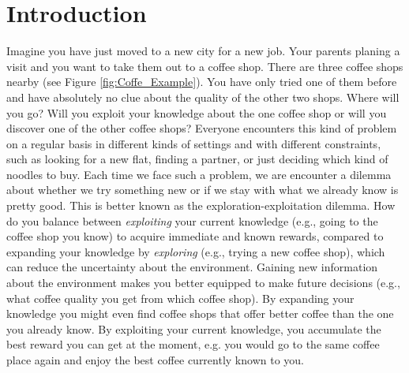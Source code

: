 %
\chapter{Introduction}
Imagine you have just moved to a new city for a new job. Your parents planing a visit and you want to take them out to a coffee shop. There are three coffee shops nearby (see Figure \ref{fig:Coffe_Example}). You have only tried one of them before and have absolutely no clue about the quality of the other two shops. Where will you go? Will you exploit your knowledge about the one coffee shop or will you discover one of the other coffee shops?
Everyone encounters this kind of problem on a regular basis in different kinds of settings and with different constraints, such as looking for a new flat, finding a partner, or just deciding which kind of noodles to buy. 
Each time we face such a problem, we are encounter a dilemma about whether we try something new or if we stay with what we already know is pretty good. 
This is better known as the exploration-exploitation dilemma. How do you balance between \textit{exploiting} your current knowledge (e.g., going to the coffee shop you know) to acquire immediate and known rewards, compared to expanding your knowledge by \textit{exploring} (e.g., trying a new coffee shop), which can reduce the uncertainty about the environment.
Gaining new information about the environment makes you better equipped to make future decisions (e.g., what coffee quality you get from which coffee shop). By expanding your knowledge you might even find coffee shops that offer better coffee than the one you already know. By exploiting your current knowledge, you accumulate the best reward you can get at the moment, e.g. you would go to the same coffee place again and enjoy the best coffee currently known to you. %


